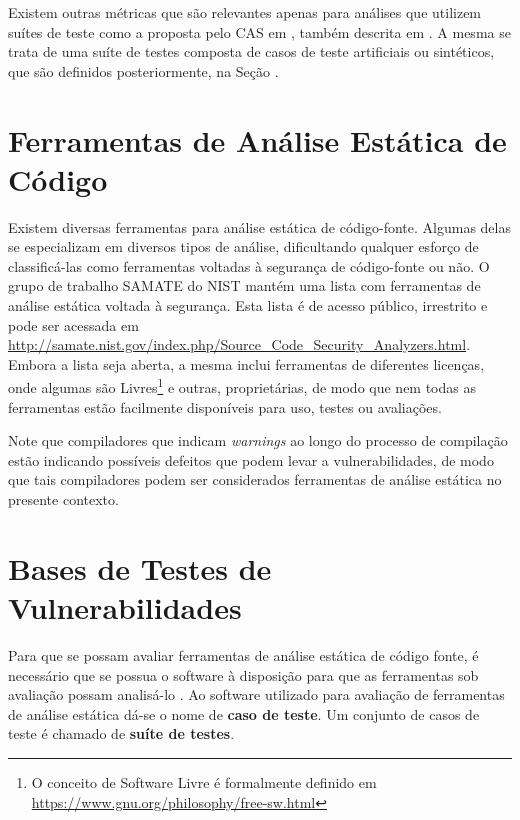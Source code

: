   Existem outras métricas que são relevantes apenas para análises que utilizem suítes de teste como a proposta pelo CAS em \cite{nsa}, também descrita em \cite{juliet}. A mesma se trata de uma suíte de testes composta de casos de teste artificiais ou sintéticos, que são definidos posteriormente, na Seção .

  \section{Ferramentas de Análise Estática de Código}

  Existem diversas ferramentas para análise estática de código-fonte. Algumas delas se especializam em diversos tipos de análise, dificultando qualquer esforço de classificá-las como ferramentas voltadas à segurança de código-fonte ou não. O grupo de trabalho SAMATE do  NIST mantém uma lista com ferramentas de análise estática voltada à segurança. Esta lista é de acesso público, irrestrito e pode ser acessada em \url{http://samate.nist.gov/index.php/Source_Code_Security_Analyzers.html}. Embora a lista seja aberta, a mesma inclui ferramentas de diferentes licenças, onde algumas são Livres\footnote{O conceito de Software Livre é formalmente definido em \url{https://www.gnu.org/philosophy/free-sw.html}} e outras, proprietárias, de modo que nem todas as ferramentas estão facilmente disponíveis para uso, testes ou avaliações.

  Note que compiladores que indicam \textit{warnings} ao longo do processo de compilação estão indicando possíveis defeitos que podem levar a vulnerabilidades, de modo que tais compiladores podem ser considerados ferramentas de análise estática no presente contexto.


  \section{Bases de Testes de Vulnerabilidades}\label{fundamentacao_teorica:bases_de_testes_de_vulnerabilidades}

  Para que se possam avaliar ferramentas de análise estática de código fonte, é necessário que se possua o software à disposição para que as ferramentas sob avaliação possam analisá-lo \cite{nsa}. Ao software utilizado para avaliação de ferramentas de análise estática dá-se o nome de \textbf{caso de teste}. Um conjunto de casos de teste é chamado de \textbf{suíte de testes}.

